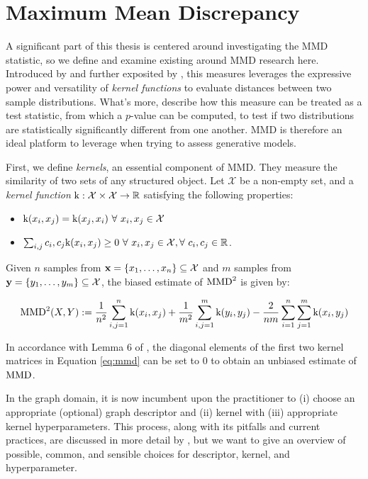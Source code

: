 \section{Maximum Mean Discrepancy}\label{sec:mmd}

A significant part of this thesis is centered around investigating the MMD
statistic, so we define and examine existing around MMD research here. Introduced by
\cite{borgwardt2006integrating} and further exposited by
\cite{gretton2012kernel}, this measures leverages the expressive power and
versatility of \emph{kernel functions} to evaluate distances between two sample
distributions. What's more, \cite{gretton2012kernel} describe how this measure
can be treated as a test statistic, from which a $p$-value can be computed, to
test if two distributions are statistically significantly different from one
another. MMD is therefore an ideal platform to leverage when trying to assess
generative models.

First, we define \emph{kernels}, an essential component of MMD. They measure the
similarity of two sets of any structured object. Let $\mathcal{X}$ be a
non-empty set, and a \emph{kernel function}
$\text{k}:\mathcal{X}\times \mathcal{X}\to\mathbb{R} $ satisfying the following
properties:

\begin{itemize}
\item $\tk(x_i,x_j)=\tk(x_j,x_i)\ \forall\ x_i,x_j\in\mathcal{X}$
\item $\sum_{i,j}c_i,c_j\tk(x_i,x_j)\geq 0\ \forall\ x_i,x_j\in\mathcal{X},
  \forall\ c_i,c_j\in\R$.
\end{itemize}

Given $n$ samples from $\mathbf{x}=\{x_1,\dots, x_n\}\subseteq\mathcal{X}$ and $m$
samples from $\mathbf{y}=\{y_1,\dots, y_m\}\subseteq\mathcal{X}$, the biased estimate
of $\text{MMD}^2$ is given by:

\begin{equation}
  \label{eq:mmd}
  \text{MMD}^2(X,Y) := {1\over n^2}\sum_{i,j=1}^n\text{k}(x_i, x_j) + {1\over m^2}\sum_{i,j=1}^m\text{k}(y_i,y_j) - {2\over nm}\sum_{i=1}^{n}\sum_{j=1}^{m}\text{k} (x_i,y_j)
\end{equation}

In accordance with Lemma 6 of \cite{gretton2012kernel}, the diagonal elements of
the first two kernel matrices in Equation \ref{eq:mmd} can be set to $0$ to
obtain an unbiased estimate of $\text{MMD}$.

In the graph domain, it is now incumbent upon the practitioner to (i) choose an
appropriate (optional) graph descriptor and (ii) kernel with (iii) appropriate
kernel hyperparameters. This process, along with its pitfalls and current
practices, are discussed in more detail by \cite{o2021evaluation}, but we want
to give an overview of possible, common, and sensible choices for descriptor,
kernel, and hyperparameter.

